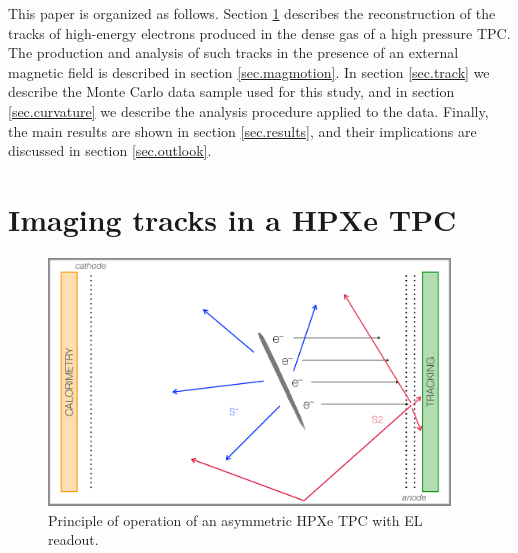 \documentclass{JINST}
\begin{document}
This paper is organized as follows.  Section \ref{sec.topology} describes the reconstruction of the tracks of high-energy electrons produced in the dense gas of a high pressure TPC.  The production and analysis of such tracks in the presence of an external magnetic field is described in section \ref{sec.magmotion}. In section \ref{sec.track} we describe the Monte Carlo data sample used for this study, and in section \ref{sec.curvature} we describe the analysis procedure applied to the data.  Finally, the main results are shown in section \ref{sec.results}, and their implications are discussed in section \ref{sec.outlook}.

\section{Imaging tracks in a HPXe TPC}
\label{sec.topology}

\begin{figure}[!htb]
\centering
\includegraphics[width= 0.95\textwidth]{img/SoftAsymmetric_bound.pdf}
\caption{Principle of operation of an asymmetric HPXe TPC with EL readout.} \label{fig.SS}
\end{figure}
\end{document}
